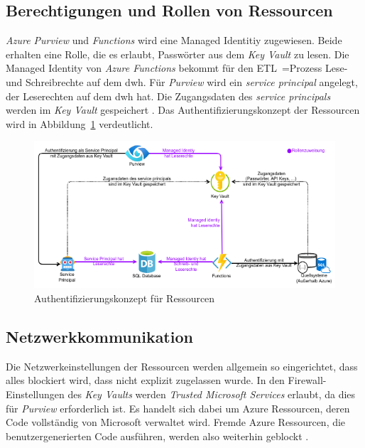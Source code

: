 \subsection{Berechtigungen und Rollen von Ressourcen} \label{subsec:infra:konfig:aad}
\textit{Azure Purview} und \textit{Functions} wird eine Managed Identitiy zugewiesen. Beide erhalten eine Rolle, die es erlaubt, Passwörter aus dem \textit{Key Vault} zu lesen. Die Managed Identity von \textit{Azure Functions} bekommt für den ETL~=Prozess Lese- und Schreibrechte auf dem \ac{dwh}. Für \textit{Purview} wird ein \textit{service principal} angelegt, der Leserechten auf dem \ac{dwh} hat. Die Zugangsdaten des \textit{service principals} werden im \textit{Key Vault} gespeichert \cite[vgl.][]{riscutia_data_2021}. Das Authentifizierungskonzept der Ressourcen wird in Abbildung~\ref{fig:chap04_ressourceAuth} verdeutlicht. 

 \begin{figure}[htbp]
 \centering
 \includegraphics[width=\textwidth]{gfx/azure/res_auth.pdf}
 \caption[Authentifizierungskonzept für Ressourcen]{Authentifizierungskonzept für Ressourcen \cite[vgl.][]{riscutia_data_2021}}
\label{fig:chap04_ressourceAuth}
\end{figure}

\subsection{Netzwerkkommunikation} \label{subsec:infra:konfig:netzwerk}
Die Netzwerkeinstellungen der Ressourcen werden allgemein so eingerichtet, dass alles blockiert wird, dass nicht explizit zugelassen wurde. In den Firewall-Einstellungen des \textit{Key Vaults} werden \textit{Trusted Microsoft Services} erlaubt, da dies für \textit{Purview} erforderlich ist. Es handelt sich dabei um Azure Ressourcen, deren Code vollständig von Microsoft verwaltet wird. Fremde Azure Ressourcen, die benutzergenerierten Code ausführen, werden also weiterhin geblockt \cite[vgl.][]{msdoc_21_keyVault_netSec}.

